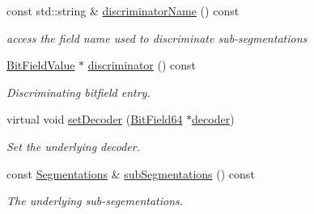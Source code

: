 \begin{DoxyCompactItemize}
const std\+::string \& \hyperlink{class_d_d4hep_1_1_d_d_segmentation_1_1_multi_segmentation_a6b12b7c8e81de25c22aafee61b5821eb}{discriminator\+Name} () const
\begin{DoxyCompactList}\small\item\em access the field name used to discriminate sub-\/segmentations \end{DoxyCompactList}\item 
\hyperlink{class_d_d4hep_1_1_d_d_segmentation_1_1_bit_field_value}{Bit\+Field\+Value} $\ast$ \hyperlink{class_d_d4hep_1_1_d_d_segmentation_1_1_multi_segmentation_afec54824e5d7d0ec1cb9077b2e215c72}{discriminator} () const
\begin{DoxyCompactList}\small\item\em Discriminating bitfield entry. \end{DoxyCompactList}\item 
virtual void \hyperlink{class_d_d4hep_1_1_d_d_segmentation_1_1_multi_segmentation_a21a046717c1aae25d103dddeb2829cb9}{set\+Decoder} (\hyperlink{class_d_d4hep_1_1_d_d_segmentation_1_1_bit_field64}{Bit\+Field64} $\ast$\hyperlink{class_d_d4hep_1_1_d_d_segmentation_1_1_segmentation_abec3489982d0fe91ef4b142d9d755576}{decoder})
\begin{DoxyCompactList}\small\item\em Set the underlying decoder. \end{DoxyCompactList}\item 
const \hyperlink{class_d_d4hep_1_1_d_d_segmentation_1_1_multi_segmentation_a083ba7cc081c5c3c47cafac5980100f8}{Segmentations} \& \hyperlink{class_d_d4hep_1_1_d_d_segmentation_1_1_multi_segmentation_ace27c57dfd4a10a4ef80f721f7d24f01}{sub\+Segmentations} () const
\begin{DoxyCompactList}\small\item\em The underlying sub-\/segementations. \end{DoxyCompactList}\end{DoxyCompactItemize}
